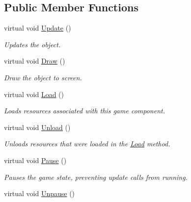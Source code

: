 \subsection*{Public Member Functions}
\begin{DoxyCompactItemize}
\item 
virtual void \hyperlink{class_tri_devs_1_1_tri_engine2_d_1_1_state_management_1_1_game_state_a98663c5a2d77ebee9ed0f1dd91f6509a}{Update} ()
\begin{DoxyCompactList}\small\item\em Updates the object. \end{DoxyCompactList}\item 
virtual void \hyperlink{class_tri_devs_1_1_tri_engine2_d_1_1_state_management_1_1_game_state_a53a4361f96b0a795f4bb20a5ae5cf954}{Draw} ()
\begin{DoxyCompactList}\small\item\em Draw the object to screen. \end{DoxyCompactList}\item 
virtual void \hyperlink{class_tri_devs_1_1_tri_engine2_d_1_1_state_management_1_1_game_state_af1ab72f80dac8aa3d00d70bbcdbf6d80}{Load} ()
\begin{DoxyCompactList}\small\item\em Loads resources associated with this game component. \end{DoxyCompactList}\item 
virtual void \hyperlink{class_tri_devs_1_1_tri_engine2_d_1_1_state_management_1_1_game_state_a007cc66067e05123773ba472da212f79}{Unload} ()
\begin{DoxyCompactList}\small\item\em Unloads resources that were loaded in the \hyperlink{class_tri_devs_1_1_tri_engine2_d_1_1_state_management_1_1_game_state_af1ab72f80dac8aa3d00d70bbcdbf6d80}{Load} method. \end{DoxyCompactList}\item 
virtual void \hyperlink{class_tri_devs_1_1_tri_engine2_d_1_1_state_management_1_1_game_state_a9bc6b5223a440c2f5d3207de7966231d}{Pause} ()
\begin{DoxyCompactList}\small\item\em Pauses the game state, preventing update calls from running. \end{DoxyCompactList}\item 
virtual void \hyperlink{class_tri_devs_1_1_tri_engine2_d_1_1_state_management_1_1_game_state_ad6f7c81f1bcbcfc3567be8a8018e6069}{Unpause} ()

\end{DoxyCompactItemize}
